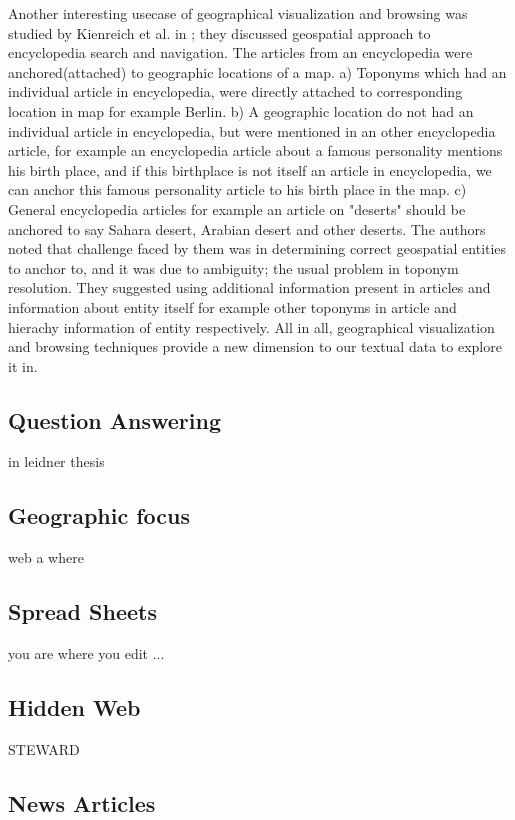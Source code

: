 \documentclass[
     11pt,         %
     a4paper,      %
     oneside,
     ]{article}
\begin{document}
Another interesting usecase of geographical visualization and browsing was studied by Kienreich et al. in \cite{Kienreich:2006:GAE:1153927.1154675}; they discussed geospatial approach to encyclopedia search and navigation. The articles from an encyclopedia were anchored(attached) to geographic locations of a map. a) Toponyms which had an individual article in encyclopedia, were directly attached to corresponding location in map for example Berlin. b) A geographic location do not had an individual article in encyclopedia, but were mentioned in an other encyclopedia article, for example an encyclopedia article about a famous personality mentions his birth place, and if this birthplace is not itself an article in encyclopedia, we can anchor this famous personality article to his birth place in the map. c) General encyclopedia articles for example an article on "deserts" should be anchored to say Sahara desert, Arabian desert and other deserts. The authors noted that challenge faced by them was in determining correct geospatial entities to anchor to, and it was due to ambiguity; the usual problem in toponym resolution. They suggested using additional information present in articles and information about entity itself for example other toponyms in article and hierachy information of entity respectively. All in all, geographical visualization and browsing techniques provide a new dimension to our textual data to explore it in.


\subsection{Question Answering} in leidner thesis
\cite{Leidner:2008:PhD}

\subsection{Geographic focus} web a where \cite{Amitay:2004:WGW:1008992.1009040}

\subsection{Spread Sheets} you are where you edit ...
\subsection{Hidden Web} STEWARD \cite{Lieberman:2007:SAS:1341012.1341045}
\subsection{News Articles} 
\end{document}
